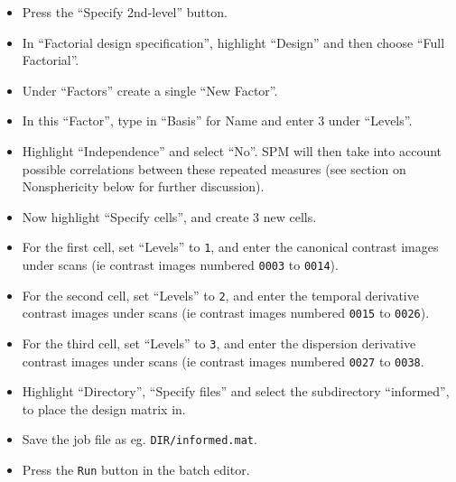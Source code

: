 \begin{itemize}
\item Press the ``Specify 2nd-level'' button.
\item In ``Factorial design specification'', highlight ``Design'' and then choose ``Full Factorial''.
\item Under ``Factors'' create a single ``New Factor''.
\item In this ``Factor'', type in ``Basis'' for Name and enter 3 under ``Levels''.
\item Highlight ``Independence'' and select ``No''. SPM will then take into account possible correlations between these repeated measures (see section on Nonsphericity below for further discussion).
\item Now highlight ``Specify cells'', and create 3 new cells.
\item For the first cell, set ``Levels'' to \texttt{1}, and enter the canonical contrast images under scans (ie contrast images numbered \texttt{0003} to \texttt{0014}).
\item For the second cell, set ``Levels'' to \texttt{2}, and enter the temporal derivative contrast images under scans (ie contrast images numbered \texttt{0015} to \texttt{0026}).
\item For the third cell, set ``Levels'' to \texttt{3}, and enter the dispersion derivative contrast images under scans (ie contrast images numbered \texttt{0027} to \texttt{0038}.
\item Highlight ``Directory'', ``Specify files'' and select the subdirectory ``informed'', to place the design matrix in.
\item Save the job file as eg. \texttt{DIR/informed.mat}.
\item Press the \texttt{Run} button in the batch editor.
\end{itemize}

